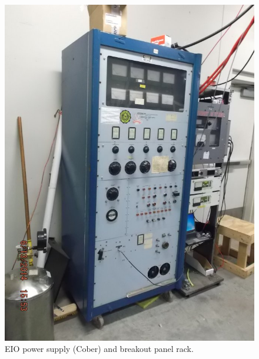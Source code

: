 \begin{figure}[htbp!]
 \centering
 \begin{minipage}{0.45\textwidth}
   \includegraphics[width=\textwidth]{./img/hv-safety-racks.jpg}
   \caption{EIO power supply (Cober) and breakout panel rack.}
 \label{fig:hv-safety-racks}
  \end{minipage}
 \quad
  \begin{minipage}{0.45\textwidth}

\end{minipage}
\end{figure}
